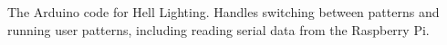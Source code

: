 The Arduino code for Hell Lighting. Handles switching between patterns and running user patterns, including reading serial data from the Raspberry Pi. 